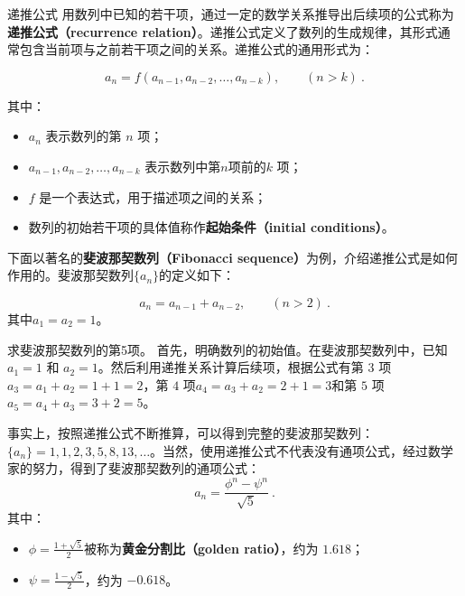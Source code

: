 \begin{definition}{递推公式}
用数列中已知的若干项，通过一定的数学关系推导出后续项的公式称为\textbf{递推公式（recurrence relation）}。递推公式定义了数列的生成规律，其形式通常包含当前项与之前若干项之间的关系。递推公式的通用形式为：

\begin{equation}
a_n = f(a_{n-1}, a_{n-2}, \dots, a_{n-k}),\qquad(n>k)~.
\end{equation}

其中：
\begin{itemize}
\item $a_n$ 表示数列的第 $n$ 项；
\item $a_{n-1}, a_{n-2}, \dots, a_{n-k}$ 表示数列中第$n$项前的$k$ 项；
\item $f$ 是一个表达式，用于描述项之间的关系；
\item 数列的初始若干项的具体值称作\textbf{起始条件（initial conditions）}。
\end{itemize}
\end{definition}

下面以著名的\textbf{斐波那契数列（Fibonacci sequence）}为例，介绍递推公式是如何作用的。斐波那契数列$\{a_n\}$的定义如下：

\begin{equation}
a_n = a_{n-1} + a_{n-2},\qquad(n>2)~.
\end{equation}
其中$a_1 =  a_2 =1$。

\begin{example}{求斐波那契数列的第5项。}
首先，明确数列的初始值。在斐波那契数列中，已知 $a_1 = 1$ 和 $a_2 = 1$。然后利用递推关系计算后续项，根据公式有第 $3$ 项$a_3 =a_1 +a_2= 1 + 1 = 2$，第 $4$ 项$a_4 = a_3 + a_2 = 2 + 1 = 3$和第 $5$ 项$a_5 = a_4 + a_3 = 3 + 2 = 5$。
\end{example}

事实上，按照递推公式不断推算，可以得到完整的斐波那契数列：$\{a_n\} = 1, 1, 2, 3, 5, 8, 13, \dots$。当然，使用递推公式不代表没有通项公式，经过数学家的努力，得到了斐波那契数列的通项公式：
\begin{equation}
a_n = \frac{\phi^n - \psi^n}{\sqrt{5}}~.
\end{equation}
其中：
\begin{itemize}
\item $\displaystyle\phi = \frac{1+\sqrt{5}}{2}$被称为\textbf{黄金分割比（golden ratio）}，约为 $1.618$；
\item $\displaystyle\psi = \frac{1-\sqrt{5}}{2}$，约为 $-0.618$。
\end{itemize}

